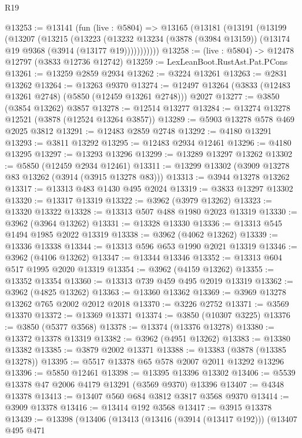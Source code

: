 \begin{lexlean}{R19}
\begin{coremodule}
@13253 := @13141
    (fun (live : @5804) =>
    @13165
      (@13181
        (@13191
          (@13199
            (@13207
              (@13215
                (@13223
                  (@13232
                    @13234
                    (@3878 (@3984 @13159))
                    (@13174 @19 @9368 (@3914 (@13177 @19)))))))))))
@13258 := (live : @5804) -> @12478 @12797 (@3833 @12736 @12742)
@13259 := LexLeanBoot.RustAst.Pat.PCons
@13261 := @13259 @2859 @2934
@13262 := @3224 @13261
@13263 := @2831 @13262
@13264 := @13263 @9370
@13274 := @12497 @13264 (@3833 (@12483 @13261 @2748) (@5850 (@12459 @13261 @2748))) @2027
@13277 := @3850 (@3854 @13262) @3857
@13278 := @12514 @13277
@13284 := @13274 @13278 @12521 (@3878 (@12524 @13264 @3857))
@13289 := @5903 @13278 @578 @469 @2025 @3812
@13291 := @12483 @2859 @2748
@13292 := @4180 @13291
@13293 := @3811 @13292
@13295 := @12483 @2934 @12461
@13296 := @4180 @13295
@13297 := @13293 @13296
@13299 := @13289 @13297 @13262
@13302 := @5850 (@12459 @2934 @12461)
@13311 := @13299 @13302 (@3909 @13278 @83 @13262 (@3914 (@3915 @13278 @83)))
@13313 := @3944 @13278 @13262
@13317 := @13313 @483 @1430 @495 @2024
@13319 := @3833 @13297 @13302
@13320 := @13317 @13319
@13322 := @3962 (@3979 @13262)
@13323 := @13320 @13322
@13328 := @13313 @507 @488 @1980 @2023 @13319
@13330 := @3962 (@3964 @13262)
@13331 := @13328 @13330
@13336 := @13313 @545 @1494 @1985 @2022 @13319
@13338 := @3962 (@4062 @13262)
@13339 := @13336 @13338
@13344 := @13313 @596 @653 @1990 @2021 @13319
@13346 := @3962 (@4106 @13262)
@13347 := @13344 @13346
@13352 := @13313 @604 @517 @1995 @2020 @13319
@13354 := @3962 (@4159 @13262)
@13355 := @13352 @13354
@13360 := @13313 @739 @459 @495 @2019 @13319
@13362 := @3962 (@4825 @13262)
@13363 := @13360 @13362
@13369 := @3969 @13278 @13262 @765 @2002 @2012 @2018
@13370 := @3226 @2752
@13371 := @3569 @13370
@13372 := @13369 @13371
@13374 := @3850 (@10307 @3225)
@13376 := @3850 (@5377 @3568)
@13378 := @13374 (@13376 @13278)
@13380 := @13372 @13378 @13319
@13382 := @3962 (@4951 @13262)
@13383 := @13380 @13382
@13385 := @3879 @2002 @13371
@13388 := @13383 (@3878 (@13385 @13278))
@13395 := @5517 @13378 @65 @578 @2007 @2011 @13292 @13296
@13396 := @5850 @12461
@13398 := @13395 @13396 @13302
@13406 := @5539 @13378 @47 @2006 @4179 @13291 (@3569 @9370) @13396
@13407 := @4348 @13378
@13413 := @13407 @560 @684 @3812 @3817 @3568 @9370
@13414 := @3909 @13378
@13416 := @13414 @192 @3568
@13417 := @3915 @13378
@13439 := @13398
    (@13406
      (@13413
        (@13416 (@3914 (@13417 @192)))
        (@13407
          @495
          @471

\end{coremodule}
\end{lexlean}

